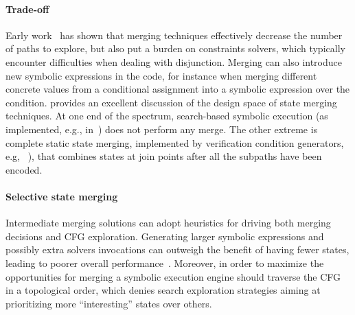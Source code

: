 \paragraph{Trade-off} Early work~\cite{G-POPL07,HSS-RV09} has shown that merging techniques effectively decrease the number of paths to explore, but also put a burden on constraints solvers, which typically encounter difficulties when dealing with disjunction. Merging can also introduce new symbolic expressions in the code, for instance when merging different concrete values from a conditional assignment into a symbolic expression over the condition. \cite{KKB-PLDI12} provides an excellent discussion of the design space of state merging techniques. At one end of the spectrum, search-based symbolic execution (as implemented, e.g., in~\cite{KLEE-OSDI08}) does not perform any merge. The other extreme is complete static state merging, implemented by verification condition generators, e.g, ~\cite{SATURN-POPL05,CALYSTO-ICSE08}), that combines states at join points after all the subpaths have been encoded.


\paragraph{Selective state merging} Intermediate merging solutions can adopt heuristics for driving both merging decisions and CFG exploration. Generating larger symbolic expressions and possibly extra solvers invocations can outweigh the benefit of having fewer states, leading to poorer overall performance~\cite{HSS-RV09,KKB-PLDI12}. Moreover, in order to maximize the opportunities for merging a symbolic execution engine should traverse the CFG in a topological order, which denies search exploration strategies aiming at prioritizing more ``interesting'' states over others.

